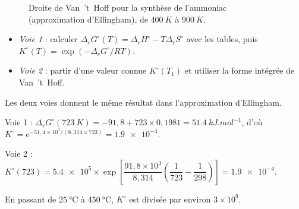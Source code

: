 \begin{figure}[H]
\centering
{}
\caption{Droite de Van~'t~Hoff pour la synthèse de l'ammoniac (approximation d'Ellingham), de $\SI{400}{K}$ à $\SI{900}{K}$.}
\label{fig:vh}
\end{figure}

\begin{methode}
\begin{itemize}
  \item \emph{Voie 1} : calculer $\Delta_rG^\circ(T) = \Delta_rH^\circ - T\Delta_rS^\circ$ avec les tables, puis $K^\circ(T) = \exp(-\Delta_rG^\circ/RT)$.
  \item \emph{Voie 2} : partir d'une valeur connue $K^\circ(T_1)$ et utiliser la forme intégrée de Van~'t~Hoff.
\end{itemize}
Les deux voies donnent le même résultat dans l'approximation d'Ellingham.
\end{methode}

\begin{exemple}
Voie 1 : $\Delta_rG^\circ(\SI{723}{K}) = -91{,}8 + 723\times0{,}1981 = \SI{51,4}{kJ.mol^{-1}}$, d'où $K^\circ = \mathrm{e}^{-51{,}4\times10^3/(8{,}314\times723)} = \num{1,9e-4}$.

\noindent Voie 2 : $K^\circ(723) = \num{5,4e5}\times\exp\left[\dfrac{91{,}8\times10^3}{8{,}314}\left(\dfrac{1}{723}-\dfrac{1}{298}\right)\right] = \num{1,9e-4}$.

\noindent En passant de $\SI{25}{\celsius}$ à $\SI{450}{\celsius}$, $K^\circ$ est divisée par environ $3\times10^9$.
\end{exemple}

